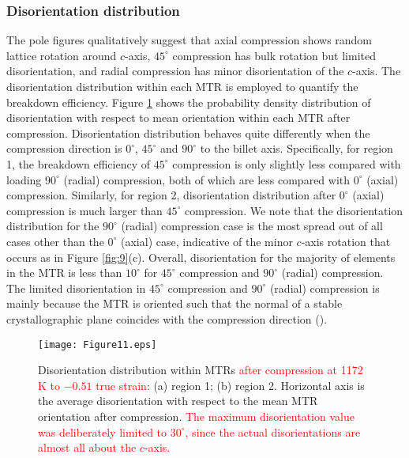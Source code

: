 \documentclass[review]{elsarticle}
\begin{document}
		\subsubsection{Disorientation distribution}
		The pole figures qualitatively suggest that axial compression shows random lattice rotation around $c$-axis, $45^{\circ}$ compression has bulk rotation but limited disorientation, and radial compression has minor disorientation of the $c$-axis.
		The disorientation distribution within each MTR is employed to quantify the breakdown efficiency.
		Figure \ref{fig:11} shows the probability density distribution of disorientation with respect to mean orientation within each MTR after compression.
		Disorientation distribution behaves quite differently when the compression direction is $0^{\circ}$, $45^{\circ}$ and $90^{\circ}$ to the billet axis.
		Specifically, for region 1, the breakdown efficiency of $45^{\circ}$ compression is only slightly less compared with loading $90^{\circ}$ (radial) compression, both of which are less compared with $0^{\circ}$ (axial) compression.
		Similarly, for region 2, disorientation distribution after $0^{\circ}$ (axial) compression is much larger than $45^{\circ}$ compression.
		We note that the disorientation distribution for the $90^{\circ}$ (radial) compression case is the most spread out of all cases other than the $0^{\circ}$ (axial) case, indicative of the minor $c$-axis rotation that occurs as in Figure \ref{fig:9}(c).
		Overall, disorientation for the majority of elements in the MTR is less than $10^{\circ}$ for $45^{\circ}$ compression and $90^{\circ}$ (radial) compression.
		The limited disorientation in $45^{\circ}$ compression and $90^{\circ}$ (radial) compression is mainly because the MTR is oriented such that the normal of a stable crystallographic plane coincides with the compression direction (\cite{r32}).
		\begin{figure}[!htb]
		\centering
		\texttt{[image: Figure11.eps]}
		\caption{\label{fig:11}Disorientation distribution within MTRs \textcolor{red}{after compression at 1172 K to $-0.51$ true strain}: (a) region 1; (b) region 2.
		Horizontal axis is the average disorientation with respect to the mean MTR orientation after compression.
		\textcolor{red}{The maximum disorientation value was deliberately limited to $30^{\circ}$, since the actual disorientations are almost all about the $c$-axis.}}
		\end{figure}
		
\end{document}
